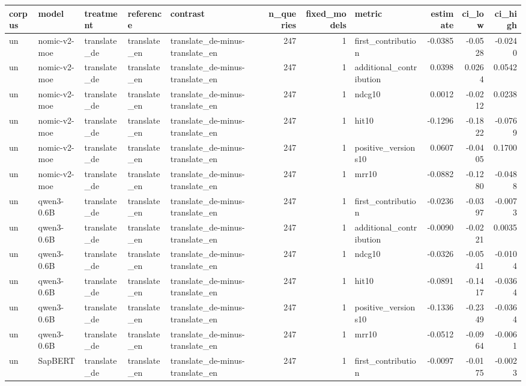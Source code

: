 \begin{tabular}{lllllrrlrrr}
\toprule
corpus & model & treatment & reference & contrast & n\_queries & fixed\_models & metric & estimate & ci\_low & ci\_high \\
\midrule
un & nomic-v2-moe & translate\_de & translate\_en & translate\_de-minus-translate\_en & 247 & 1 & first\_contribution & -0.0385 & -0.0528 & -0.0240 \\
un & nomic-v2-moe & translate\_de & translate\_en & translate\_de-minus-translate\_en & 247 & 1 & additional\_contribution & 0.0398 & 0.0264 & 0.0542 \\
un & nomic-v2-moe & translate\_de & translate\_en & translate\_de-minus-translate\_en & 247 & 1 & ndcg10 & 0.0012 & -0.0212 & 0.0238 \\
un & nomic-v2-moe & translate\_de & translate\_en & translate\_de-minus-translate\_en & 247 & 1 & hit10 & -0.1296 & -0.1822 & -0.0769 \\
un & nomic-v2-moe & translate\_de & translate\_en & translate\_de-minus-translate\_en & 247 & 1 & positive\_versions10 & 0.0607 & -0.0405 & 0.1700 \\
un & nomic-v2-moe & translate\_de & translate\_en & translate\_de-minus-translate\_en & 247 & 1 & mrr10 & -0.0882 & -0.1280 & -0.0488 \\
un & qwen3-0.6B & translate\_de & translate\_en & translate\_de-minus-translate\_en & 247 & 1 & first\_contribution & -0.0236 & -0.0397 & -0.0073 \\
un & qwen3-0.6B & translate\_de & translate\_en & translate\_de-minus-translate\_en & 247 & 1 & additional\_contribution & -0.0090 & -0.0221 & 0.0035 \\
un & qwen3-0.6B & translate\_de & translate\_en & translate\_de-minus-translate\_en & 247 & 1 & ndcg10 & -0.0326 & -0.0541 & -0.0104 \\
un & qwen3-0.6B & translate\_de & translate\_en & translate\_de-minus-translate\_en & 247 & 1 & hit10 & -0.0891 & -0.1417 & -0.0364 \\
un & qwen3-0.6B & translate\_de & translate\_en & translate\_de-minus-translate\_en & 247 & 1 & positive\_versions10 & -0.1336 & -0.2349 & -0.0364 \\
un & qwen3-0.6B & translate\_de & translate\_en & translate\_de-minus-translate\_en & 247 & 1 & mrr10 & -0.0512 & -0.0964 & -0.0061 \\
un & SapBERT & translate\_de & translate\_en & translate\_de-minus-translate\_en & 247 & 1 & first\_contribution & -0.0097 & -0.0175 & -0.0023 \\

\end{tabular}
